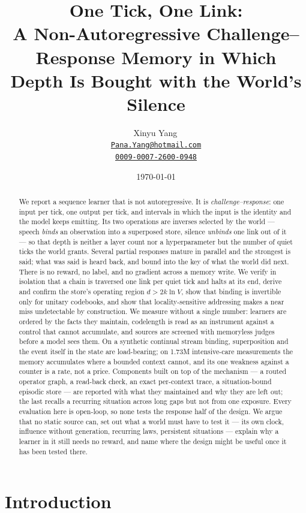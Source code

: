 \documentclass[11pt,a4paper]{article}
\title{One Tick, One Link:\\
{\large A Non-Autoregressive Challenge--Response Memory in Which\\
Depth Is Bought with the World's Silence}}
\author{%
  Xinyu Yang\,\orcidlink{0009-0007-2600-0948}\\
  \href{mailto:Pana.Yang@hotmail.com}{\texttt{Pana.Yang@hotmail.com}}\\
  \href{https://orcid.org/0009-0007-2600-0948}{\texttt{0009-0007-2600-0948}}
}
\date{\today}
\theoremstyle{plain}
\theoremstyle{definition}
\theoremstyle{remark}
\begin{document}
\maketitle

\begin{abstract}
We report a sequence learner that is not autoregressive. It is
\emph{challenge--response}: one input per tick, one output per tick, and
intervals in which the input is the identity and the model keeps emitting. Its
two operations are inverses selected by the world --- speech \emph{binds} an
observation into a superposed store, silence \emph{unbinds} one link out of it
--- so that depth is neither a layer count nor a hyperparameter but the number
of quiet ticks the world grants. Several partial responses mature in parallel
and the strongest is said; what was said is heard back, and bound into the key
of what the world did next. There is no reward, no label, and no gradient across
a memory write. We verify in isolation that a chain is traversed one link per
quiet tick and halts at its end, derive and confirm the store's operating
region $d>2k\ln V$, show that binding is invertible only for unitary codebooks,
and show that locality-sensitive addressing makes a near miss undetectable by
construction. We measure without a single number: learners are ordered by the
facts they maintain, codelength is read as an instrument against a control
that cannot accumulate, and sources are screened with memoryless judges before
a model sees them. On a synthetic continual stream binding, superposition and
the event itself in the state are load-bearing; on 1.73M intensive-care
measurements the memory accumulates where a bounded context cannot, and its
one weakness against a counter is a rate, not a price. Components built on top
of the mechanism --- a routed operator graph, a read-back check, an exact
per-context trace, a situation-bound episodic store --- are reported with what
they maintained and why they are left out; the last recalls a recurring
situation across long gaps but not from one exposure. Every evaluation here is
open-loop, so none tests the response half of the design. We argue that no
static source can, set out what a world must have to test it --- its own clock,
influence without generation, recurring laws, persistent situations ---
explain why a learner in it still needs no reward, and name where the design might be useful once it has been tested there.
\end{abstract}

\section{Introduction}
\end{document}
